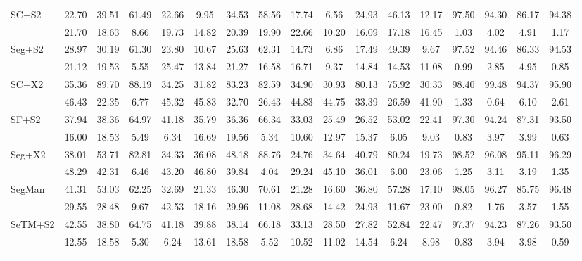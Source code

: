 \documentclass[preprint,12pt]{elsarticle}
\begin{document}
\begin{table}[!htbp]
\begin{tabular}{lcccccccccccccccc}
SC+S2 & 22.70 & 39.51 & 61.49 & 22.66 & 9.95 & 34.53 & 58.56 & 17.74 & 6.56 & 24.93 & 46.13 & 12.17 & 97.50 & 94.30 & 86.17 & 94.38 \\
  & 21.70 & 18.63 & 8.66 & 19.73 & 14.82 & 20.39 & 19.90 & 22.66 & 10.20 & 16.09 & 17.18 & 16.45 & 1.03 & 4.02 & 4.91 & 1.17 \\ \addlinespace[3pt]
\rowcolor{gray!12}
Seg+S2 & 28.97 & 30.19 & 61.30 & 23.80 & 10.67 & 25.63 & 62.31 & 14.73 & 6.86 & 17.49 & 49.39 & 9.67 & 97.52 & 94.46 & 86.33 & 94.53 \\
  & 21.12 & 19.53 & 5.55 & 25.47 & 13.84 & 21.27 & 16.58 & 16.71 & 9.37 & 14.84 & 14.53 & 11.08 & 0.99 & 2.85 & 4.95 & 0.85 \\ \addlinespace[3pt]
SC+X2 & 35.36 & 89.70 & 88.19 & 34.25 & 31.82 & 83.23 & 82.59 & 34.90 & 30.93 & 80.13 & 75.92 & 30.33 & 98.40 & 99.48 & 94.37 & 95.90 \\
  & 46.43 & 22.35 & 6.77 & 45.32 & 45.83 & 32.70 & 26.43 & 44.83 & 44.75 & 33.39 & 26.59 & 41.90 & 1.33 & 0.64 & 6.10 & 2.61 \\ \addlinespace[3pt]
\rowcolor{gray!12}
SF+S2 & 37.94 & 38.36 & 64.97 & 41.18 & 35.79 & 36.36 & 66.34 & 33.03 & 25.49 & 26.52 & 53.02 & 22.41 & 97.30 & 94.24 & 87.31 & 93.50 \\
  & 16.00 & 18.53 & 5.49 & 6.34 & 16.69 & 19.56 & 5.34 & 10.60 & 12.97 & 15.37 & 6.05 & 9.03 & 0.83 & 3.97 & 3.99 & 0.63 \\ \addlinespace[3pt]
Seg+X2 & 38.01 & 53.71 & 82.81 & 34.33 & 36.08 & 48.18 & 88.76 & 24.76 & 34.64 & 40.79 & 80.24 & 19.73 & 98.52 & 96.08 & 95.11 & 96.29 \\
  & 48.29 & 42.31 & 6.46 & 43.20 & 46.80 & 39.84 & 4.04 & 29.24 & 45.10 & 36.01 & 6.00 & 23.06 & 1.25 & 3.11 & 3.19 & 1.35 \\ \addlinespace[3pt]
\rowcolor{gray!12}
SegMan & 41.31 & 53.03 & 62.25 & 32.69 & 21.33 & 46.30 & 70.61 & 21.28 & 16.60 & 36.80 & 57.28 & 17.10 & 98.05 & 96.27 & 85.75 & 96.48 \\
  & 29.55 & 28.48 & 9.67 & 42.53 & 18.16 & 29.96 & 11.08 & 28.68 & 14.42 & 24.93 & 11.67 & 23.00 & 0.82 & 1.76 & 3.57 & 1.55 \\ \addlinespace[3pt]
SeTM+S2 & 42.55 & 38.80 & 64.75 & 41.18 & 39.88 & 38.14 & 66.18 & 33.13 & 28.50 & 27.82 & 52.84 & 22.47 & 97.37 & 94.23 & 87.26 & 93.50 \\
  & 12.55 & 18.58 & 5.30 & 6.24 & 13.61 & 18.58 & 5.52 & 10.52 & 11.02 & 14.54 & 6.24 & 8.98 & 0.83 & 3.94 & 3.98 & 0.59 \\ \addlinespace[3pt]
\rowcolor{gray!12}

\end{tabular}
\end{table}
\end{document}
